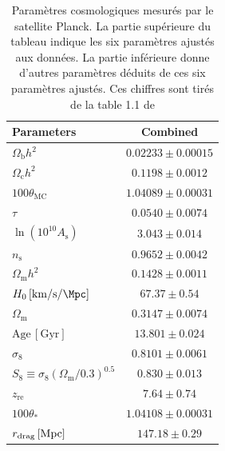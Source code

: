 \documentclass[11pt, twoside, a4paper, openright]{report}
\begin{document}
\begin{table}[h]
  \centering
  \caption{Paramètres cosmologiques mesurés par le satellite Planck. La partie supérieure du tableau indique les six paramètres ajustés aux données. La partie inférieure donne d'autres paramètres déduits de ces six paramètres ajustés. Ces chiffres sont tirés de la table 1.1 de \textcite{Collaboration2018}}
  \label{table:planck2018}
  \begin{tabular}{lc}
    \toprule
    Parameters & Combined \\
    \midrule
    $\Omega_{\mathrm{b}}h^2$\dotfill & $0.02233\pm0.00015$ \\
    $\Omega_{\mathrm{c}}h^2$\dotfill & $0.1198\pm0.0012$ \\
    $100\theta_{\mathrm{MC}}$\dotfill & $1.04089\pm0.00031$ \\
    $\tau$\dotfill & $0.0540\pm0.0074$ \\
    $\ln(10^{10}A_\mathrm{s})$\dotfill & $3.043\pm0.014$ \\
    $n_\mathrm{s}$\dotfill & $0.9652\pm0.0042$ \\
    \midrule
    $\Omega_{\mathrm{m}} h^2$\dotfill & $ 0.1428\pm 0.0011 $ \\
    $H_0 \,[\si{\kilo\meter\per\second\per\Mpc}]$\dotfill & $67.37\pm0.54$ \\
    $\Omega_{\mathrm{m}}$\dotfill & $0.3147\pm0.0074$ \\
    $\mathrm{Age}\, [\mathrm{Gyr}]$\dotfill  & $13.801\pm0.024$ \\
    $\sigma_8$\dotfill & $0.8101\pm0.0061$ \\
    $S_8\equiv \sigma_8 (\Omega_{\mathrm{m}}/0.3)^{0.5}$\dotfill & $0.830\pm0.013$ \\
    $z_{\mathrm{re}}$\dotfill & $7.64\pm0.74$ \\
    $100\theta_\ast$\dotfill & $1.04108\pm0.00031$ \\
    $r_{\mathrm{drag}} \,[{\rm Mpc}]$\dotfill & $147.18\pm0.29$ \\
    \bottomrule
  \end{tabular}
\end{table}
\end{document}
